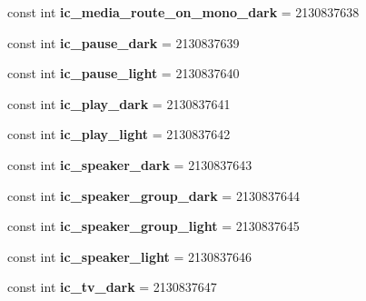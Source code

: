 \begin{DoxyCompactItemize}
const int {\bfseries ic\+\_\+media\+\_\+route\+\_\+on\+\_\+mono\+\_\+dark} = 2130837638
\item 
\mbox{\label{classXaria_1_1Resource_1_1Drawable_a600946d2126131eb6c3bce415746434f}} 
const int {\bfseries ic\+\_\+pause\+\_\+dark} = 2130837639
\item 
\mbox{\label{classXaria_1_1Resource_1_1Drawable_ab8543312e1d52ffdaeec1950b5897df0}} 
const int {\bfseries ic\+\_\+pause\+\_\+light} = 2130837640
\item 
\mbox{\label{classXaria_1_1Resource_1_1Drawable_af8b632e37e66ce2bf4f9565a7d1cf1f3}} 
const int {\bfseries ic\+\_\+play\+\_\+dark} = 2130837641
\item 
\mbox{\label{classXaria_1_1Resource_1_1Drawable_a0bf3c5efcfaee011115fe20d307e2c82}} 
const int {\bfseries ic\+\_\+play\+\_\+light} = 2130837642
\item 
\mbox{\label{classXaria_1_1Resource_1_1Drawable_a5d4f4f36a53eb99c9076412aab40db98}} 
const int {\bfseries ic\+\_\+speaker\+\_\+dark} = 2130837643
\item 
\mbox{\label{classXaria_1_1Resource_1_1Drawable_a5df7bb42c6b64dad49704ae0c37bfdb1}} 
const int {\bfseries ic\+\_\+speaker\+\_\+group\+\_\+dark} = 2130837644
\item 
\mbox{\label{classXaria_1_1Resource_1_1Drawable_ae4c5564f2b6c04b8b38d64191e46e6ab}} 
const int {\bfseries ic\+\_\+speaker\+\_\+group\+\_\+light} = 2130837645
\item 
\mbox{\label{classXaria_1_1Resource_1_1Drawable_a9f8068d9f94902020717b5501f791ded}} 
const int {\bfseries ic\+\_\+speaker\+\_\+light} = 2130837646
\item 
\mbox{\label{classXaria_1_1Resource_1_1Drawable_ac9cd4e3b5e7416c86781cca58787cce3}} 
const int {\bfseries ic\+\_\+tv\+\_\+dark} = 2130837647
\item 

\end{DoxyCompactItemize}
